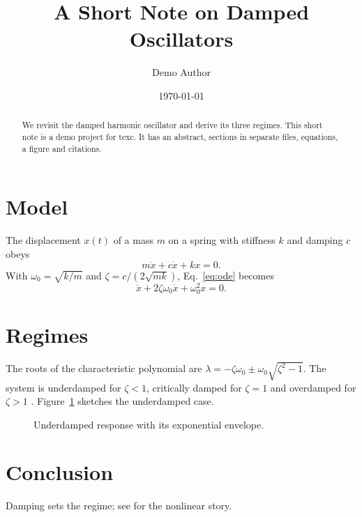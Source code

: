 \documentclass[11pt]{article}
\title{A Short Note on Damped Oscillators}
\author{Demo Author}
\date{\today}
\begin{document}
\maketitle

\begin{abstract}
We revisit the damped harmonic oscillator and derive its three regimes.
This short note is a demo project for texc.
It has an abstract, sections in separate files, equations, a figure and citations.
\end{abstract}



\section{Model}\label{sec:model}
The displacement $x(t)$ of a mass $m$ on a spring with stiffness $k$ and damping $c$ obeys
\begin{equation}\label{eq:ode}
  m\ddot{x} + c\dot{x} + kx = 0 .
\end{equation}
With $\omega_0 = \sqrt{k/m}$ and $\zeta = c / (2\sqrt{mk})$, Eq.~\eqref{eq:ode} becomes
\begin{equation}
  \ddot{x} + 2\zeta\omega_0\dot{x} + \omega_0^2 x = 0 .
\end{equation}

\section{Regimes}\label{sec:regimes}
The roots of the characteristic polynomial are $\lambda = -\zeta\omega_0 \pm \omega_0\sqrt{\zeta^2-1}$.
The system is underdamped for $\zeta<1$, critically damped for $\zeta=1$ and overdamped for $\zeta>1$ \citep{goldstein2002}.
Figure~\ref{fig:decay} sketches the underdamped case.

\begin{figure}[h]
  \centering
  \caption{Underdamped response with its exponential envelope.}
  \label{fig:decay}
\end{figure}

\section{Conclusion}
Damping sets the regime; see \citet{strogatz2015} for the nonlinear story.



\end{document}
